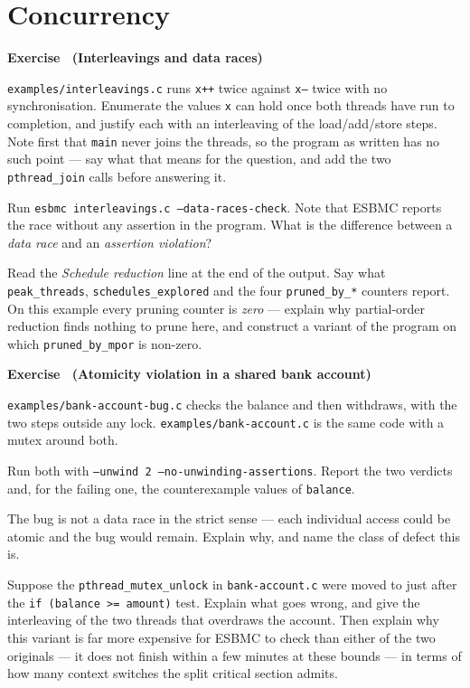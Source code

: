 \documentclass[11pt,a4paper]{article}
\newcommand{\esbmc}{ESBMC}
\newcommand{\file}[1]{\texttt{\small #1}}
\newcounter{exc}
\renewcommand{\theexc}{\arabic{exc}}
\newenvironment{exercise}[2][]
  {\stepcounter{exc}\ifx\relax#1\relax\else\excref{#1}\fi%
   \medskip\noindent\textbf{Exercise \theexc\ (#2)}\par\nopagebreak\smallskip}
  {\par\medskip}
\begin{document}
\section{Concurrency}

\begin{exercise}{Interleavings and data races}
\begin{parts}
  \item \file{examples/interleavings.c} runs \texttt{x++} twice against
        \texttt{x--} twice with no synchronisation. Enumerate the values
        \texttt{x} can hold once both threads have run to completion, and
        justify each with an interleaving of the load/add/store steps. Note
        first that \texttt{main} never joins the threads, so the program as
        written has no such point --- say what that means for the question, and
        add the two \texttt{pthread\_join} calls before answering it.
  \item Run \texttt{esbmc interleavings.c --data-races-check}. Note that
        \esbmc{} reports the race without any assertion in the program. What
        is the difference between a \emph{data race} and an
        \emph{assertion violation}?
  \item Read the \emph{Schedule reduction} line at the end of the output. Say
        what \texttt{peak\_threads}, \texttt{schedules\_explored} and the four
        \texttt{pruned\_by\_*} counters report. On this example every pruning
        counter is \emph{zero} --- explain why partial-order reduction finds
        nothing to prune here, and construct a variant of the program on which
        \texttt{pruned\_by\_mpor} is non-zero.
\end{parts}
\end{exercise}

\begin{exercise}{Atomicity violation in a shared bank account}
\file{examples/bank-account-bug.c} checks the balance and then withdraws, with
the two steps outside any lock. \file{examples/bank-account.c} is the same code
with a mutex around both.

\begin{parts}
  \item Run both with \texttt{--unwind 2 --no-unwinding-assertions}. Report the
        two verdicts and, for the failing one, the counterexample values of
        \texttt{balance}.
  \item The bug is not a data race in the strict sense --- each individual
        access could be atomic and the bug would remain. Explain why, and name
        the class of defect this is.
  \item Suppose the \texttt{pthread\_mutex\_unlock} in \file{bank-account.c}
        were moved to just after the \texttt{if (balance >= amount)} test.
        Explain what goes wrong, and give the interleaving of the two threads
        that overdraws the account. Then explain why this variant is far more
        expensive for \esbmc{} to check than either of the two originals ---
        it does not finish within a few minutes at these bounds --- in terms of
        how many context switches the split critical section admits.
\end{parts}
\end{exercise}
\end{document}
